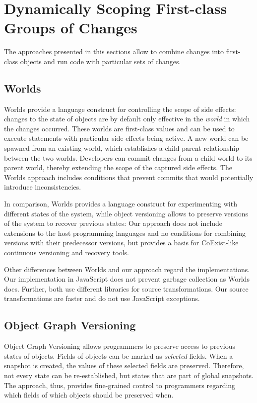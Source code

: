 \section{Dynamically Scoping First-class Groups of Changes}

The approaches presented in this sections allow to combine changes into first-class objects and run code with particular sets of changes.


\subsection{Worlds}

Worlds provide a language construct for controlling the scope of side effects: changes to the state of objects are by default only effective in the \emph{world} in which the changes occurred.
These worlds are first-class values and can be used to execute statements with particular side effects being active.
A new world can be spawned from an existing world, which establishes a child-parent relationship between the two worlds.
Developers can commit changes from a child world to its parent world, thereby extending the scope of the captured side effects.
The Worlds approach includes conditions that prevent commits that would potentially introduce inconsistencies.

In comparison, Worlds provides a language construct for experimenting with different states of the system, while object versioning allows to preserve versions of the system to recover previous states: Our approach does not include extensions to the host programming languages and no conditions for combining versions with their predecessor versions, but provides a basis for CoExist-like continuous versioning and recovery tools.

Other differences between Worlds and our approach regard the implementations.
Our implementation in JavaScript does not prevent garbage collection as Worlds does.
Further, both use different libraries for source transformations.
Our source transformations are faster and do not use JavaScript exceptions.


\subsection{Object Graph Versioning}

Object Graph Versioning\cite{Pluquet2009ECP} allows programmers to preserve access to previous states of objects.
Fields of objects can be marked as \emph{selected} fields.
When a snapshot is created, the values of these selected fields are preserved.
Therefore, not every state can be re-established, but states that are part of global snapshots. 
The approach, thus, provides fine-grained control to programmers regarding which fields of which objects should be preserved when.

